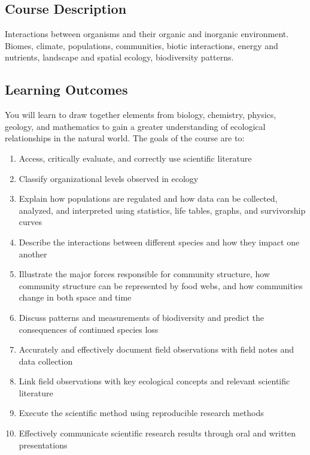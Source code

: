\documentclass{tufte-handout}
\begin{document}
\begin{fullwidth}

\section{Course Description}

Interactions between organisms and their organic and inorganic environment. Biomes, climate, populations, communities, biotic interactions, energy and nutrients, landscape and spatial ecology, biodiversity patterns.

\subsection{Learning Outcomes}

You will learn to draw together elements from biology, chemistry, physics, geology, and mathematics to gain a greater understanding of ecological relationships in the natural world. The goals of the course are to:


\begin{enumerate}
	\item Access, critically evaluate, and correctly use scientific literature
	\item Classify organizational levels observed in ecology
	\item Explain how populations are regulated and how data can be collected, analyzed, and interpreted using statistics, life tables, graphs, and survivorship curves
	\item Describe the interactions between different species and how they impact one another
	\item Illustrate the major forces responsible for community structure, how community structure can be represented by food webs, and how communities change in both space and time
	\item Discuss patterns and measurements of biodiversity and predict the consequences of continued species loss
	\item Accurately and effectively document field observations with field notes and data collection
	\item Link field observations with key ecological concepts and relevant scientific literature
	\item Execute the scientific method using reproducible research methods
	\item Effectively communicate scientific research results through oral and written presentations
\end{enumerate}


\end{fullwidth}
\end{document}

